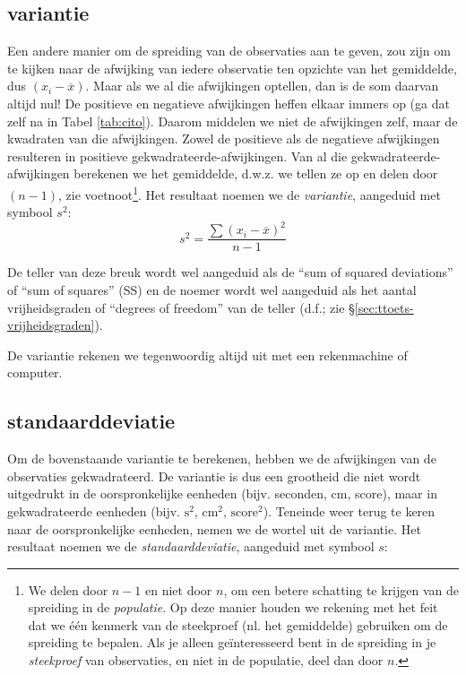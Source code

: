 \documentclass[
]{book}
\begin{document}
\hypertarget{sec:variantie}{%
\subsection{variantie}\label{sec:variantie}}

Een andere
manier om de spreiding van de observaties aan te geven, zou zijn om te
kijken naar de afwijking van iedere observatie ten opzichte van het
gemiddelde, dus \((x_i-\overline{x})\). Maar als we al die afwijkingen
optellen, dan is de som daarvan altijd nul! De positieve en negatieve
afwijkingen heffen elkaar immers op (ga dat zelf na in
Tabel \ref{tab:cito}).
Daarom middelen we niet de afwijkingen zelf, maar de kwadraten van die
afwijkingen. Zowel de positieve als de negatieve afwijkingen resulteren
in positieve gekwadrateerde-afwijkingen. Van al die
gekwadrateerde-afwijkingen berekenen we het gemiddelde, d.w.z. we tellen
ze op en delen door \((n-1)\), zie voetnoot\footnote{We delen door \(n-1\) en niet door \(n\), om een betere schatting te krijgen van de spreiding in de \emph{populatie}. Op deze manier houden we rekening met het feit dat we één kenmerk van de steekproef (nl. het gemiddelde) gebruiken om de spreiding te bepalen. Als je alleen geïnteresseerd bent in de spreiding in je \emph{steekproef} van observaties, en niet in de populatie, deel dan door \(n\).}. Het resultaat noemen we
de \emph{variantie}, aangeduid met symbool \(s^2\):
\begin{equation}
  s^2 = \frac{ \sum (x_i - \overline{x})^2 } {n-1}
  \label{eq:variantie}
\end{equation}

De teller van
deze breuk wordt wel aangeduid als de ``sum of squared deviations'' of
``sum of squares'' (SS) en de noemer wordt wel aangeduid als het aantal
vrijheidsgraden of ``degrees of freedom'' van de teller (d.f.; zie
§\ref{sec:ttoets-vrijheidsgraden}).

De variantie rekenen we tegenwoordig altijd uit met een rekenmachine of
computer.

\hypertarget{sec:standaarddeviatie}{%
\subsection{standaarddeviatie}\label{sec:standaarddeviatie}}

Om de bovenstaande variantie te berekenen, hebben we de afwijkingen van
de observaties gekwadrateerd. De variantie is dus een grootheid die niet
wordt uitgedrukt in de oorspronkelijke eenheden (bijv. seconden, cm,
score), maar in gekwadrateerde eenheden (bijv. \(\textrm{s}^2\),
\(\textrm{cm}^2\), \(\textrm{score}^2\)). Teneinde weer terug te keren naar
de oorspronkelijke eenheden, nemen we de wortel uit de variantie. Het
resultaat noemen we de \emph{standaarddeviatie}, aangeduid met symbool \(s\):
\end{document}
